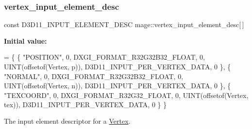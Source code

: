 \subsubsection{\texorpdfstring{vertex\+\_\+input\+\_\+element\+\_\+desc}{vertex\_input\_element\_desc}}
{\footnotesize\ttfamily const D3\+D11\+\_\+\+I\+N\+P\+U\+T\+\_\+\+E\+L\+E\+M\+E\+N\+T\+\_\+\+D\+E\+SC mage\+::vertex\+\_\+input\+\_\+element\+\_\+desc\mbox{[}$\,$\mbox{]}}

{\bfseries Initial value\+:}
\begin{DoxyCode}
= \{
        \{ \textcolor{stringliteral}{"POSITION"}, 0, DXGI\_FORMAT\_R32G32B32\_FLOAT, 0, UINT(offsetof(Vertex, p)),   
      D3D11\_INPUT\_PER\_VERTEX\_DATA, 0 \},
        \{ \textcolor{stringliteral}{"NORMAL"},   0, DXGI\_FORMAT\_R32G32B32\_FLOAT, 0, UINT(offsetof(Vertex, n)),   
      D3D11\_INPUT\_PER\_VERTEX\_DATA, 0 \},
        \{ \textcolor{stringliteral}{"TEXCOORD"}, 0, DXGI\_FORMAT\_R32G32\_FLOAT,    0, UINT(offsetof(Vertex, tex)), 
      D3D11\_INPUT\_PER\_VERTEX\_DATA, 0 \}
    \}
\end{DoxyCode}
The input element descriptor for a \hyperlink{structmage_1_1_vertex}{Vertex}. 